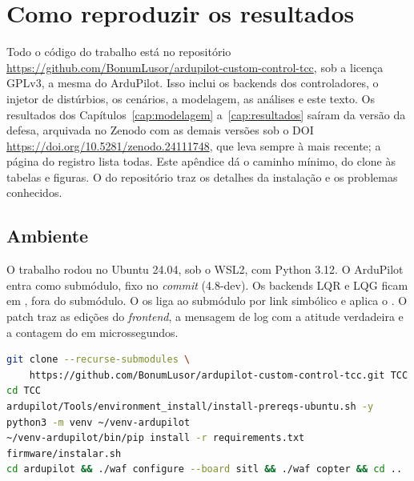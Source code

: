 \chapter{Como reproduzir os resultados}
\label{ap:reproduzir}

Todo o código do trabalho está no repositório
\url{https://github.com/BonumLusor/ardupilot-custom-control-tcc}, sob a licença
GPLv3, a mesma do ArduPilot. Isso inclui os backends dos controladores, o
injetor de distúrbios, os cenários, a modelagem, as análises e este texto. Os
resultados dos Capítulos~\ref{cap:modelagem} a~\ref{cap:resultados} saíram da
versão da defesa, arquivada no Zenodo com as demais versões sob o DOI
\url{https://doi.org/10.5281/zenodo.24111748}, que leva sempre à mais recente;
a página do registro lista todas. Este apêndice
dá o caminho mínimo, do clone às tabelas e figuras. O  do
repositório traz os detalhes da instalação e os problemas conhecidos.

\section{Ambiente}

O trabalho rodou no Ubuntu 24.04, sob o WSL2, com Python 3.12. O ArduPilot
entra como submódulo, fixo no \textit{commit} 
(4.8-dev). Os backends LQR e LQG ficam em , fora do
submódulo. O  os liga ao submódulo por
link simbólico e aplica o . O patch traz as
edições do \textit{frontend}, a mensagem de log  com a atitude
verdadeira e a contagem do  em microssegundos.

\begin{lstlisting}[language=bash,numbers=none]
git clone --recurse-submodules \
    https://github.com/BonumLusor/ardupilot-custom-control-tcc.git TCC
cd TCC
ardupilot/Tools/environment_install/install-prereqs-ubuntu.sh -y
python3 -m venv ~/venv-ardupilot
~/venv-ardupilot/bin/pip install -r requirements.txt
firmware/instalar.sh
cd ardupilot && ./waf configure --board sitl && ./waf copter && cd ..
\end{lstlisting}

